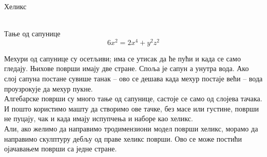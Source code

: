 \documentclass[sr]{./../../common/SurferDesc}%
\begin{document}
\footnotesize


\begin{surferPage}
  \begin{surferTitle}Хеликс \end{surferTitle}   \\
Тање од сапунице\\
  \smallskip
\[6x^2	= 2x^4	+ y^2	z^2\]

\singlespacing
Мехури од сапунице су осетљиви; има се утисак да ће пући и када се само гледају. Њихове површи имају две стране. Споља је сапун а унутра вода. Ако слој сапуна постане сувише танак – ово се дешава када мехур постаје већи – вода проузрокује да мехур пукне.\\
\vspace{0,3cm}
Алгебарске површи су много тање од сапунице, састоје се само од слојева тачака. И пошто користимо машту да створимо ове тачке, без масе или густине, површи не пуцају, чак и када имају испупчења и наборе као хеликс.\\
\vspace{0,3cm}
Али, ако желимо да направимо тродимензиони модел површи хеликс, морамо да направимо скулптуру дебљу од праве хеликс површи. Ово се може постићи ојачавањем површи са једне стране.

  \begin{surferText}
     \end{surferText}
\end{surferPage}



 
\end{document}
